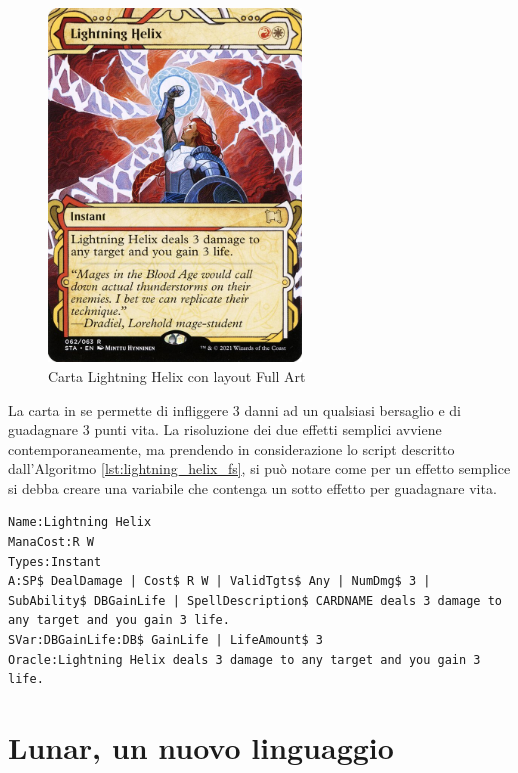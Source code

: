 \begin{figure}
	\centering
	\includegraphics[width=0.6\textwidth]{Immagini/sta-62-lightning-helix.jpg}
	\caption{Carta Lightning Helix con layout Full Art}
	\label{fig:lightning_helix}
\end{figure}
La carta in se permette di infliggere 3 danni ad un qualsiasi bersaglio e di guadagnare 3 punti vita. La risoluzione dei due effetti semplici avviene contemporaneamente, ma prendendo in considerazione lo script descritto dall'Algoritmo \ref{lst:lightning_helix_fs}, si può notare come per un effetto semplice si debba creare una variabile che contenga un sotto effetto per guadagnare vita.

\begin{algorithm}
	\caption{Script della carta in Figura \ref{fig:lightning_helix} in ForgeScript}
	\label{lst:lightning_helix_fs}
	\begin{lstlisting}
Name:Lightning Helix
ManaCost:R W
Types:Instant
A:SP$ DealDamage | Cost$ R W | ValidTgts$ Any | NumDmg$ 3 | SubAbility$ DBGainLife | SpellDescription$ CARDNAME deals 3 damage to any target and you gain 3 life.
SVar:DBGainLife:DB$ GainLife | LifeAmount$ 3
Oracle:Lightning Helix deals 3 damage to any target and you gain 3 life.
	\end{lstlisting}
\end{algorithm}


\section{Lunar, un nuovo linguaggio}\label{sec:lunar_dsl}


